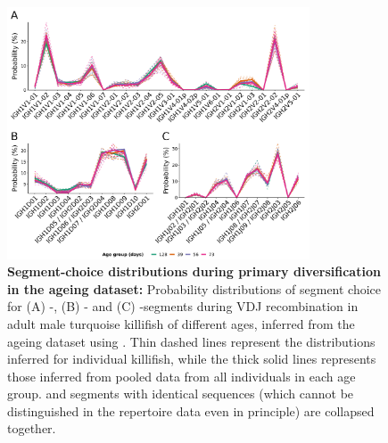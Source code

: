 \begin{figure}
\centering
\includegraphics[width = 0.8\textwidth]{_Figures/png/ageing-igor-segments}
\caption[Segment-choice distributions during primary diversification in the ageing dataset]
{\textbf{Segment-choice distributions during primary diversification in the ageing dataset:} Probability distributions of segment choice for (A) \vh-, (B) \dh- and (C) \jh-segments during VDJ recombination in adult male turquoise killifish of different ages, inferred from the \igseq ageing dataset using . Thin dashed lines represent the distributions inferred for individual killifish, while the thick solid lines represents those inferred from pooled data from all individuals in each age group. \dh and \jh segments with identical sequences (which cannot be distinguished in the repertoire data even in principle) are collapsed together.}
\label{fig:igseq-ageing-igor-segments}
\end{figure}

